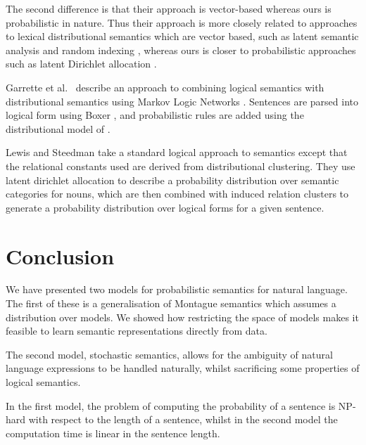 \documentclass[11pt]{article}
\theoremstyle{definition}
\begin{document}
The second difference is that their approach is vector-based whereas
ours is probabilistic in nature. Thus their approach is more
closely related to approaches to lexical distributional semantics
which are vector based, such as latent semantic analysis
\cite{Deerwester:90} and random indexing \cite{Sahlgren:02}, whereas
ours is closer to probabilistic approaches such as latent Dirichlet
allocation \cite{Blei:03}.

Garrette et al.~\cite{Garrette:11} describe an approach to combining logical
semantics with distributional semantics using Markov Logic Networks
\cite{Richardson:06}. Sentences are parsed into logical form using
Boxer \cite{Bos:04}, and probabilistic rules are added using the
distributional model of \cite{Erk:10}.

Lewis and Steedman \cite{Lewis:13} take a standard logical approach to
semantics except that the relational constants used are derived from
distributional clustering. They use latent dirichlet allocation to
describe a probability distribution over semantic categories for
nouns, which are then combined with induced relation clusters to
generate a probability distribution over logical forms for a given
sentence.

\section{Conclusion}

We have presented two models for probabilistic semantics for natural
language. The first of these is a generalisation of Montague semantics
which assumes a distribution over models. We showed how restricting
the space of models makes it feasible to learn semantic
representations directly from data.

The second model, stochastic semantics, allows for the ambiguity of
natural language expressions to be handled naturally, whilst
sacrificing some properties of logical semantics.

In the first model, the problem of computing the probability of a
sentence is NP-hard with respect to the length of a sentence, whilst
in the second model the computation time is linear in the sentence
length.

\end{document}
